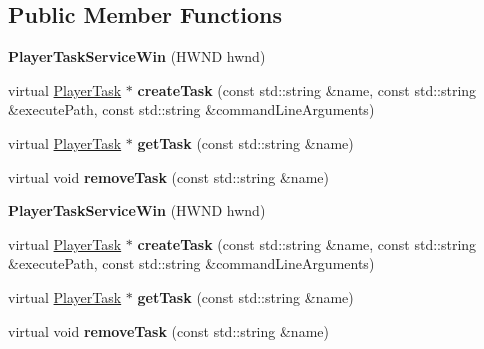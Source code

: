 \subsection*{Public Member Functions}
\begin{DoxyCompactItemize}
\item 
\mbox{\label{classPlayerTaskServiceWin_a95b4c892aebfec4d8e980bb8476177ff}} 
{\bfseries Player\+Task\+Service\+Win} (H\+W\+ND hwnd)
\item 
\mbox{\label{classPlayerTaskServiceWin_ac30c8ee23b2fc58942698e7790fc4a53}} 
virtual \hyperlink{classPlayerTask}{Player\+Task} $\ast$ {\bfseries create\+Task} (const std\+::string \&name, const std\+::string \&execute\+Path, const std\+::string \&command\+Line\+Arguments)
\item 
\mbox{\label{classPlayerTaskServiceWin_a08cf22c4de4fcbf55bdceade74e297ab}} 
virtual \hyperlink{classPlayerTask}{Player\+Task} $\ast$ {\bfseries get\+Task} (const std\+::string \&name)
\item 
\mbox{\label{classPlayerTaskServiceWin_a47635cf984fc60108db438587571af11}} 
virtual void {\bfseries remove\+Task} (const std\+::string \&name)
\item 
\mbox{\label{classPlayerTaskServiceWin_a95b4c892aebfec4d8e980bb8476177ff}} 
{\bfseries Player\+Task\+Service\+Win} (H\+W\+ND hwnd)
\item 
\mbox{\label{classPlayerTaskServiceWin_a2e75aeaec847cb9b25ecd0977b6405c3}} 
virtual \hyperlink{classPlayerTask}{Player\+Task} $\ast$ {\bfseries create\+Task} (const std\+::string \&name, const std\+::string \&execute\+Path, const std\+::string \&command\+Line\+Arguments)
\item 
\mbox{\label{classPlayerTaskServiceWin_a71cf23bb1c5eb86bae2242229656721b}} 
virtual \hyperlink{classPlayerTask}{Player\+Task} $\ast$ {\bfseries get\+Task} (const std\+::string \&name)
\item 
\mbox{\label{classPlayerTaskServiceWin_a991eae5ef014bc6fff0e473fa43a05e1}} 
virtual void {\bfseries remove\+Task} (const std\+::string \&name)
\end{DoxyCompactItemize}
